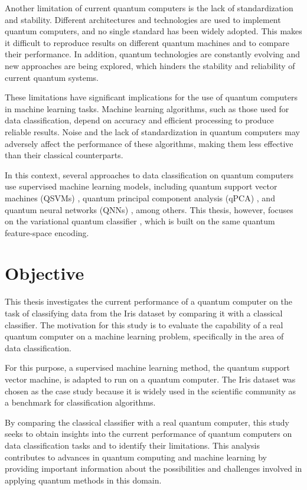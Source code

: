 Another limitation of current quantum computers is the lack of standardization and stability. Different architectures and technologies are used to implement quantum computers, and no single standard has been widely adopted. This makes it difficult to reproduce results on different quantum machines and to compare their performance. In addition, quantum technologies are constantly evolving and new approaches are being explored, which hinders the stability and reliability of current quantum systems.

These limitations have significant implications for the use of quantum computers in machine learning tasks. Machine learning algorithms, such as those used for data classification, depend on accuracy and efficient processing to produce reliable results. Noise and the lack of standardization in quantum computers may adversely affect the performance of these algorithms, making them less effective than their classical counterparts.

In this context, several approaches to data classification on quantum computers use supervised machine learning models, including quantum support vector machines (QSVMs) \cite{Rebentrost2014QSVM}, quantum principal component analysis (qPCA) \cite{Lloyd2014qPCA}, and quantum neural networks (QNNs) \cite{Abhijith2022QuantumAlgorithm}, among others. This thesis, however, focuses on the variational quantum classifier \cite{Havlicek2019qSupervisedLearning}, which is built on the same quantum feature-space encoding.

\section{Objective} \label{sec1}

This thesis investigates the current performance of a quantum computer on the task of classifying data from the Iris dataset by comparing it with a classical classifier. The motivation for this study is to evaluate the capability of a real quantum computer on a machine learning problem, specifically in the area of data classification.

For this purpose, a supervised machine learning method, the quantum support vector machine, is adapted to run on a quantum computer. The Iris dataset was chosen as the case study because it is widely used in the scientific community as a benchmark for classification algorithms.

By comparing the classical classifier with a real quantum computer, this study seeks to obtain insights into the current performance of quantum computers on data classification tasks and to identify their limitations. This analysis contributes to advances in quantum computing and machine learning by providing important information about the possibilities and challenges involved in applying quantum methods in this domain.

